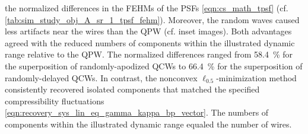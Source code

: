 the normalized differences in
the \acp{FEHM} of
the \acp{PSF}
\eqref{eqn:cs_math_tpsf}
(cf. \cref{tab:sim_study_obj_A_sr_1_tpsf_fehm}).
Moreover,
the random waves caused less
artifacts near
the wires than
the \ac{QPW}
(cf. inset images).
Both advantages agreed with
the reduced numbers of
components within
the illustrated dynamic range relative to
the \ac{QPW}.
The normalized differences ranged from
\SI{58.4}{\percent} for
the superposition of
randomly-apodized \acp{QCW} to
\SI{66.4}{\percent} for
the superposition of
randomly-delayed \acp{QCW}.
In contrast,
the nonconvex $\ell_{0.5}$-minimization method
 consistently recovered
isolated components that matched
the specified compressibility fluctuations
\eqref{eqn:recovery_sys_lin_eq_gamma_kappa_bp_vector}.
The numbers of
components within
the illustrated dynamic range equaled
the number of
wires.


